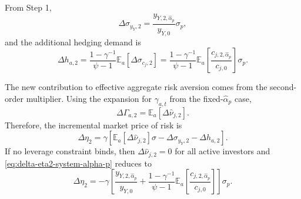 From Step 1,
\begin{equation}
    \Delta\sigma_{y_Y,2}
    =\frac{y_{Y,2,\hat{\alpha}_p}}{y_{Y,0}}\sigma_p,
\end{equation}
and the additional hedging demand is
\begin{equation}
    \Delta h_{a,2}
    =\frac{1-\gamma^{-1}}{\psi-1}\mathbb{E}_a[\Delta\sigma_{c_j,2}]
    =\frac{1-\gamma^{-1}}{\psi-1}\mathbb{E}_a\left[\frac{c_{j,2,\hat{\alpha}_p}}{c_{j,0}}\right]\sigma_p.
\end{equation}

The new contribution to effective aggregate risk aversion comes from the second-order multiplier.
Using the expansion for $\gamma_{a,t}$ from the fixed-$\hat{\alpha}_p$ case,
\begin{equation}
    \Delta\Gamma_{a,2}=\mathbb{E}_a[\Delta\hat{\nu}_{j,2}].
\end{equation}
Therefore, the incremental market price of risk is
\begin{equation}\label{eq:delta-eta2-system-alpha-p}
    \Delta\eta_2
    =\gamma\left[
        \mathbb{E}_a[\Delta\hat{\nu}_{j,2}]\sigma
        -\Delta\sigma_{y_Y,2}
        -\Delta h_{a,2}
    \right].
\end{equation}
If no leverage constraint binds, then $\Delta\hat{\nu}_{j,2}=0$ for all active investors and \eqref{eq:delta-eta2-system-alpha-p} reduces to
\begin{equation}
    \Delta\eta_2
    =-\gamma\left[
        \frac{y_{Y,2,\hat{\alpha}_p}}{y_{Y,0}}
        +\frac{1-\gamma^{-1}}{\psi-1}\mathbb{E}_a\left[\frac{c_{j,2,\hat{\alpha}_p}}{c_{j,0}}\right]
    \right]\sigma_p.
\end{equation}

